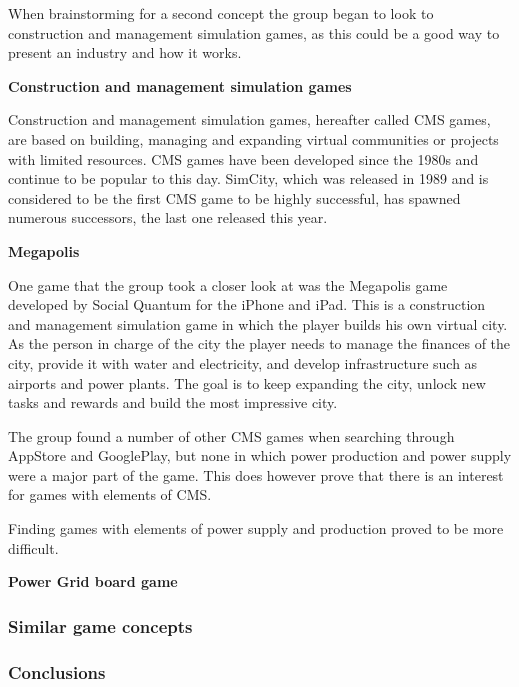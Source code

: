 When brainstorming for a second concept the group began to look to construction
and management simulation games, as this could be a good way to present an
industry and how it works.

{\bf Construction and management simulation games}

Construction and management simulation games, hereafter called CMS games, are
based on building, managing and expanding virtual communities or projects
with limited resources. CMS games have been developed since the 1980s and
continue to be popular to this day. SimCity, which was released in 1989 and
is considered to be the first CMS game to be highly successful, has spawned
numerous successors, the last one released this year.

{\bf Megapolis}

One game that the group took a closer look at was the Megapolis game developed
by Social Quantum for the iPhone and iPad. This is a construction and
management simulation game in which the player builds his own virtual city. As
the person in charge of the city the player needs to manage the finances of the
city, provide it with water and electricity, and develop infrastructure such as
airports and power plants. The goal is to keep expanding the city, unlock new
tasks and rewards and build the most impressive city.

The group found a number of other CMS games when searching through AppStore and
GooglePlay, but none in which power production and power supply were a major
part of the game. This does however prove that there is an interest for games
with elements of CMS.

Finding games with elements of power supply and production proved to be more
difficult.

{\bf Power Grid board game}

\subsubsection{Similar game concepts}

\subsubsection{Conclusions}
